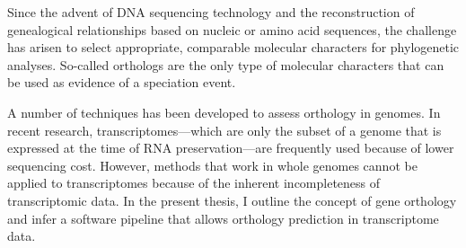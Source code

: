 Since the advent of DNA sequencing technology and the reconstruction of
genealogical relationships based on nucleic or amino acid sequences, the
challenge has arisen to select appropriate, comparable molecular characters for
phylogenetic analyses. So-called orthologs are the only type of molecular
characters that can be used as evidence of a speciation event. 

A number of techniques has been developed to assess orthology in genomes. In
recent research, transcriptomes---which are only the subset of a genome that is
expressed at the time of RNA preservation---are frequently used because of lower
sequencing cost. However, methods that work in whole genomes cannot be applied
to transcriptomes because of the inherent incompleteness of transcriptomic data.
In the present thesis, I outline the concept of gene orthology and infer a
software pipeline that allows orthology prediction in transcriptome data.

